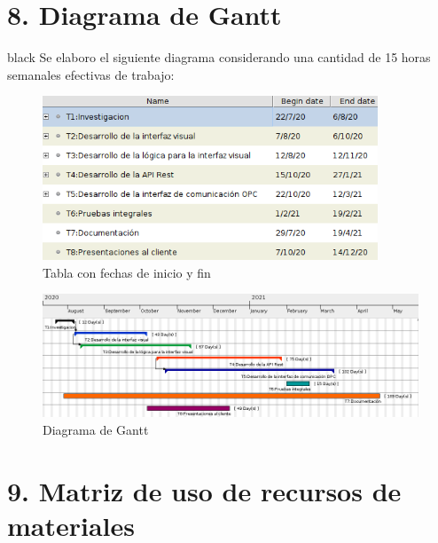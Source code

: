 \documentclass[11pt]{charter}
\begin{document}
\section{8. Diagrama de Gantt}
\label{sec:gantt}

\begin{consigna}{black}
Se elaboro el siguiente diagrama considerando una cantidad de 15 horas semanales efectivas de trabajo:

\begin{figure}[H]
 \centering
 \includegraphics[width=10cm]{gantt_1.png}
 \caption{Tabla con fechas de inicio y fin}
 \label{figure:Tabla}
\end{figure}



\begin{figure}[H]
 \centering
 \includegraphics[width=17cm]{gantt_2.png}
 \caption{Diagrama de Gantt}
 \label{figure:Diagrama de Gantt}
\end{figure}

\end{consigna}

\section{9. Matriz de uso de recursos de materiales}
\label{sec:recursos}
\end{document}
